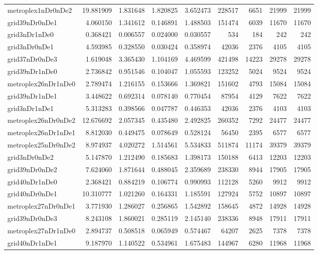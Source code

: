 \documentclass[../../../thesis.tex]{subfiles}
\begin{document}
\begin{longtable}{|l|r|r|r|r|r|r|r|r|}
metroplex1nDr0nDe2 & 19.881909 & 1.831648 & 1.820825 & 3.652473 & 228517 & 6651 & 21999 & 21999 \\
grid39nDr0nDe1 & 4.060150 & 1.341612 & 0.146891 & 1.488503 & 151474 & 6039 & 11670 & 11670 \\
grid3nDr1nDe0 & 0.368421 & 0.006557 & 0.024000 & 0.030557 & 534 & 184 & 242 & 242 \\
grid3nDr0nDe1 & 4.593985 & 0.328550 & 0.030424 & 0.358974 & 42036 & 2376 & 4105 & 4105 \\
grid37nDr0nDe3 & 1.619048 & 3.365430 & 1.104169 & 4.469599 & 421498 & 14223 & 29278 & 29278 \\
grid39nDr1nDe0 & 2.736842 & 0.951546 & 0.104047 & 1.055593 & 123252 & 5024 & 9524 & 9524 \\
metroplex26nDr1nDe0 & 2.789474 & 1.216155 & 0.153666 & 1.369821 & 151602 & 4793 & 15084 & 15084 \\
grid39nDr1nDe1 & 3.448622 & 0.692314 & 0.078140 & 0.770454 & 87954 & 4129 & 7622 & 7622 \\
grid3nDr1nDe1 & 5.313283 & 0.398566 & 0.047787 & 0.446353 & 42036 & 2376 & 4103 & 4103 \\
metroplex26nDr0nDe2 & 12.676692 & 2.057345 & 0.435480 & 2.492825 & 260352 & 7292 & 24477 & 24477 \\
metroplex26nDr1nDe1 & 8.812030 & 0.449475 & 0.078649 & 0.528124 & 56450 & 2395 & 6577 & 6577 \\
metroplex25nDr0nDe2 & 8.974937 & 4.020272 & 1.514561 & 5.534833 & 511874 & 11174 & 39379 & 39379 \\
grid3nDr0nDe2 & 5.147870 & 1.212490 & 0.185683 & 1.398173 & 150188 & 6413 & 12203 & 12203 \\
grid39nDr0nDe2 & 7.624060 & 1.871644 & 0.488045 & 2.359689 & 238330 & 8944 & 17905 & 17905 \\
grid40nDr1nDe0 & 2.368421 & 0.884219 & 0.106774 & 0.990993 & 112128 & 5260 & 9912 & 9912 \\
grid40nDr0nDe1 & 10.310777 & 1.021260 & 0.164331 & 1.185591 & 127924 & 5752 & 10897 & 10897 \\
metroplex27nDr0nDe1 & 3.771930 & 1.286027 & 0.256865 & 1.542892 & 158645 & 4872 & 14928 & 14928 \\
grid39nDr0nDe3 & 8.243108 & 1.860021 & 0.285119 & 2.145140 & 238336 & 8948 & 17911 & 17911 \\
metroplex27nDr1nDe0 & 2.894737 & 0.508518 & 0.065949 & 0.574467 & 64207 & 2625 & 7378 & 7378 \\
grid40nDr1nDe1 & 9.187970 & 1.140522 & 0.534961 & 1.675483 & 144967 & 6280 & 11968 & 11968 \\

\end{longtable}
\end{document}
